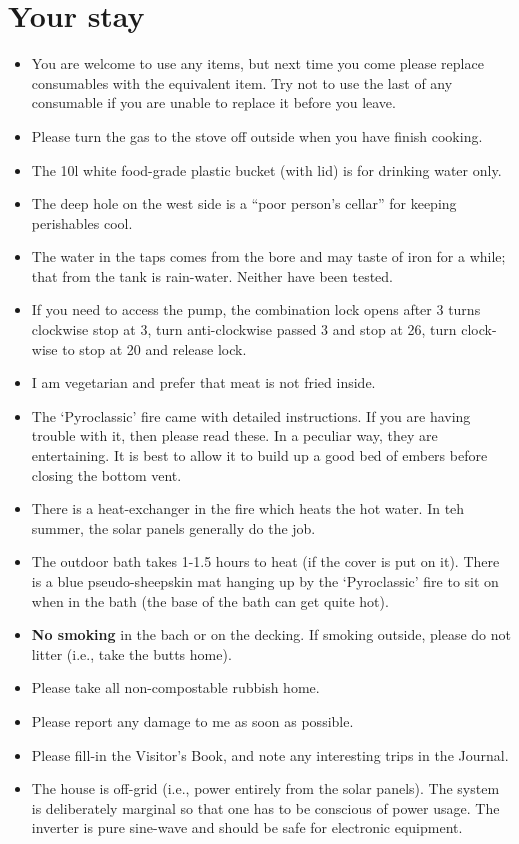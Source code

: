 \documentclass[12pt]{article} %
\begin{document}
  \section{Your stay}
  \begin{itemize}
    \item You are welcome to use any items, but next time you come
    please replace consumables with the equivalent item.  Try not to
    use the last of any consumable if you are unable to replace it
    before you leave.
    \item Please turn the gas to the stove off outside when
      you have finish cooking.
    \item The 10l white food-grade plastic bucket (with lid) is for
      drinking water only.
    \item The deep hole on the west side is a ``poor person's cellar''
      for keeping perishables cool.
    \item The water in the taps comes from the bore and may taste of iron for a while; that from the tank is rain-water.  Neither have been tested.
    \item If you need to access the pump, the combination lock opens after 3 turns clockwise stop at 3, turn anti-clockwise passed 3 and stop at 26, turn clock-wise to stop at 20 and release lock.
    \item I am vegetarian and prefer that meat is not fried inside.
    \item The `Pyroclassic' fire came with detailed instructions.  If you
      are having trouble with it, then please read these.  In a
      peculiar way, they are entertaining.  It is best to allow it to build up a good bed of embers before closing the bottom vent.
    \item There is a heat-exchanger in the fire which heats the hot water.  In teh summer, the solar panels generally do the job.
    \item The outdoor bath takes 1-1.5 hours to heat (if the cover
      is put on it).  There is a blue pseudo-sheepskin mat hanging up by the `Pyroclassic' fire to sit on when in the bath (the base of the bath can get quite hot).
    \item \textbf{No smoking} in the bach or on the decking.  If
    smoking outside, please do not litter (i.e., take the butts home).
    \item Please take all non-compostable rubbish home.
    \item Please report any damage to me as soon as possible.
    \item Please fill-in the Visitor's Book, and note any interesting
      trips in the Journal.
    \item The house is off-grid (i.e., power entirely from the solar panels).  The system is deliberately marginal so that one has to be conscious of power usage.  The inverter is pure sine-wave and should be safe for electronic equipment.
  \end{itemize}
 
\end{document}

